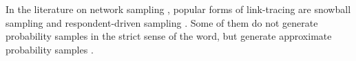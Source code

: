 In the literature on network sampling \citep{Fr88b,ThFr00,GiHa06,HaGi09},
popular forms of link-tracing are snowball sampling \citep{Go61} and respondent-driven sampling \citep*{He97,SaHe04,GiHa10,Gi11,kurant.et.al:jsac:2011}.
Some of them do not generate probability samples in the strict sense of the word, 
but generate approximate probability samples \citep[e.g.,][]{Gi11}.
